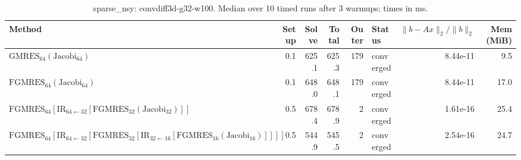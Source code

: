 \begin{table}[t]
\centering
\small
\caption{sparse_nsy: convdiff3d-g32-w100. Median over 10 timed runs after 3 warmups; times in ms.}
\label{tab:sparse_nsy-convdiff3d-g32-w100}
\begin{tabular}{lrrrrlrr}
\hline
Method & Setup & Solve & Total & Outer & Status & $\|b-Ax\|_2/\|b\|_2$ & Mem (MiB) \\
\hline
$\mathrm{GMRES}_{64}(\mathrm{Jacobi}_{64})$ & 0.1 & 625.1 & 625.3 & 179 & converged & 8.44e-11 & 9.5 \\
$\mathrm{FGMRES}_{64}(\mathrm{Jacobi}_{64})$ & 0.1 & 648.0 & 648.1 & 179 & converged & 8.44e-11 & 17.0 \\
$\mathrm{FGMRES}_{64}[\mathrm{IR}_{64\leftarrow 32}[\mathrm{FGMRES}_{32}(\mathrm{Jacobi}_{32})]]$ & 0.5 & 678.4 & 678.9 & 2 & converged & 1.61e-16 & 25.4 \\
$\mathrm{FGMRES}_{64}[\mathrm{IR}_{64\leftarrow 32}[\mathrm{FGMRES}_{32}[\mathrm{IR}_{32\leftarrow 16}[\mathrm{FGMRES}_{16}(\mathrm{Jacobi}_{16})]]]]$ & 0.5 & 544.9 & 545.5 & 2 & converged & 2.54e-16 & 24.7 \\
\hline
\end{tabular}
\end{table}
